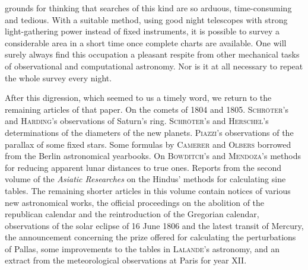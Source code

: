 grounds for thinking that searches of this kind are so arduous, time-consuming and tedious. With a suitable method, using good night telescopes with strong light-gathering power instead of fixed instruments, it is possible to survey a considerable area in a short time once complete charts are available. One will surely always find this occupation a pleasant respite from other mechanical tasks of observational and computational astronomy. Nor is it at all necessary to repeat the whole survey every night.

After this digression, which seemed to us a timely word, we return to the remaining articles of that paper. On the comets of 1804 and 1805. \textsc{Schröter}’s and \textsc{Harding}’s
 observations of Saturn’s ring. \textsc{Schröter}’s and \textsc{Herschel}’s determinations of the diameters of the new planets. \textsc{Piazzi}’s observations of the parallax of some fixed stars. Some formulas by \textsc{Camerer} and \textsc{Olbers} borrowed from the Berlin astronomical yearbooks. On \textsc{Bowditch}’s and \textsc{Mendoza}’s methods for reducing apparent lunar distances to true ones. Reports from the second volume of the \emph{Asiatic Researches} on the Hindus’ methods for calculating sine tables. The remaining shorter articles in this volume contain notices of various new astronomical works, the official proceedings on the abolition of the republican calendar and the reintroduction of the Gregorian calendar, observations of the solar eclipse of 16 June 1806 and the latest transit of Mercury, the announcement concerning the prize offered for calculating the perturbations of Pallas, some improvements to the tables in \textsc{Lalande}’s astronomy, and an extract from the meteorological observations at Paris for year XII.

